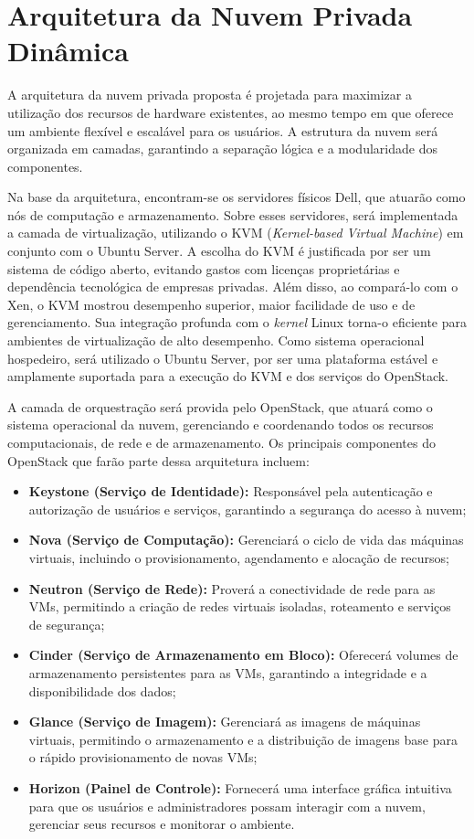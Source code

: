 \section{Arquitetura da Nuvem Privada Dinâmica}

A arquitetura da nuvem privada proposta é projetada para maximizar a utilização dos recursos de hardware existentes, ao mesmo tempo em que oferece um ambiente flexível e escalável para os usuários. A estrutura da nuvem será organizada em camadas, garantindo a separação lógica e a modularidade dos componentes.

Na base da arquitetura, encontram-se os servidores físicos Dell, que atuarão como nós de computação e armazenamento. Sobre esses servidores, será implementada a camada de virtualização, utilizando o KVM (\textit{Kernel-based Virtual Machine}) em conjunto com o Ubuntu Server. A escolha do KVM é justificada por ser um sistema de código aberto, evitando gastos com licenças proprietárias e dependência tecnológica de empresas privadas. Além disso, ao compará-lo com o Xen, o KVM mostrou desempenho superior, maior facilidade de uso e de gerenciamento. Sua integração profunda com o \textit{kernel} Linux torna-o eficiente para ambientes de virtualização de alto desempenho. Como sistema operacional hospedeiro, será utilizado o Ubuntu Server, por ser uma plataforma estável e amplamente suportada para a execução do KVM e dos serviços do OpenStack.

A camada de orquestração será provida pelo OpenStack, que atuará como o sistema operacional da nuvem, gerenciando e coordenando todos os recursos computacionais, de rede e de armazenamento. Os principais componentes do OpenStack que farão parte dessa arquitetura incluem:

\begin{itemize}
 \item \textbf{Keystone (Serviço de Identidade):} Responsável pela autenticação e autorização de usuários e serviços, garantindo a segurança do acesso à nuvem;
 \item \textbf{Nova (Serviço de Computação):} Gerenciará o ciclo de vida das máquinas virtuais, incluindo o provisionamento, agendamento e alocação de recursos;
 \item \textbf{Neutron (Serviço de Rede):} Proverá a conectividade de rede para as VMs, permitindo a criação de redes virtuais isoladas, roteamento e serviços de segurança;
 \item \textbf{Cinder (Serviço de Armazenamento em Bloco):} Oferecerá volumes de armazenamento persistentes para as VMs, garantindo a integridade e a disponibilidade dos dados;
 \item \textbf{Glance (Serviço de Imagem):} Gerenciará as imagens de máquinas virtuais, permitindo o armazenamento e a distribuição de imagens base para o rápido provisionamento de novas VMs;
 \item \textbf{Horizon (Painel de Controle):} Fornecerá uma interface gráfica intuitiva para que os usuários e administradores possam interagir com a nuvem, gerenciar seus recursos e monitorar o ambiente.
\end{itemize}

